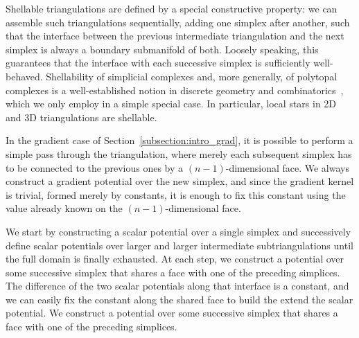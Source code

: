 Shellable triangulations are defined by a special constructive property:
we can assemble such triangulations sequentially, adding one simplex after another, such that the interface between the previous intermediate triangulation and the next simplex is always a boundary submanifold of both.
Loosely speaking, this guarantees that the interface with each successive simplex is sufficiently well-behaved.
Shellability of simplicial complexes and, more generally, of polytopal complexes is a well-established notion in discrete geometry and combinatorics~\cite{ziegler1995lectures}, which we only employ in a simple special case. 
In particular, local stars in 2D and 3D triangulations are shellable. 


In the gradient case of Section~\ref{subsection:intro_grad}, it is possible to perform a simple pass through the triangulation, 
where merely each subsequent simplex has to be connected to the previous ones by a $(n-1)$-dimensional face. 
We always construct a gradient potential over the new simplex, and since the gradient kernel is trivial, 
formed merely by constants, it is enough to fix this constant using the value already known on the $(n-1)$-dimensional face.








We start by constructing a scalar potential over a single simplex
and successively define scalar potentials over larger and larger intermediate subtriangulations until the full domain is finally exhausted.
At each step, we construct a potential over some successive simplex that shares a face with one of the preceding simplices.
The difference of the two scalar potentials along that interface is a constant,
and we can easily fix the constant along the shared face to build the extend the scalar potential. 
We construct a potential over some successive simplex that shares a face with one of the preceding simplices.


